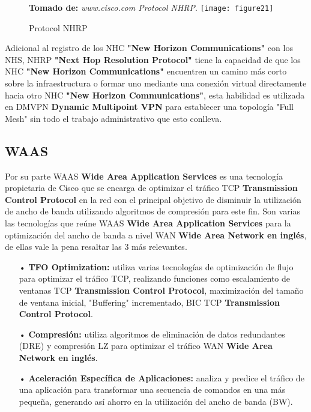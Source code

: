\begin{itemize}
\begin{figure}[htbp]
 \textbf{Tomado de:} \textit{www.cisco.com Protocol NHRP}.
  \centering
    {\texttt{[image: figure21]}}%
  \caption{Protocol NHRP}
  \label{fig:fig2subfig}
\end{figure}
Adicional al registro de los NHC \textbf{"New Horizon Communications"} con los NHS, NHRP \textbf{"Next Hop Resolution Protocol"} tiene la capacidad de que los NHC \textbf{"New Horizon Communications"} encuentren un camino más corto sobre la infraestructura o formar uno mediante una conexión virtual directamente hacia otro NHC \textbf{"New Horizon Communications"}, esta habilidad es utilizada en DMVPN \textbf{ Dynamic Multipoint VPN} para establecer una topología "Full Mesh" sin todo el trabajo administrativo que esto conlleva.
\end{itemize}

\subsection{WAAS}

Por su parte WAAS \textbf{Wide Area Application Services} es una tecnología propietaria de Cisco que se encarga de optimizar el tráfico TCP \textbf{Transmission Control Protocol} en la red con el principal objetivo de disminuir la utilización de ancho de banda utilizando algoritmos de compresión para este fin. Son varias las tecnologías que reúne WAAS \textbf{Wide Area Application Services} para la optimización del ancho de banda a nivel WAN \textbf{Wide Area Network en inglés}, de ellas vale la pena resaltar las 3 más relevantes.

\begin{itemize}
\item[•]\textbf{TFO Optimization:} utiliza varias tecnologías de optimización de flujo para optimizar el tráfico TCP, realizando funciones como escalamiento de ventanas TCP \textbf{Transmission Control Protocol}, maximización del tamaño de ventana inicial, "Buffering" incrementado, BIC TCP \textbf{Transmission Control Protocol}.
\item[•]\textbf{Compresión:} utiliza algoritmos de eliminación de datos redundantes (DRE) y compresión LZ para optimizar el tráfico WAN \textbf{Wide Area Network en inglés}.
\item[•]\textbf{Aceleración Específica de Aplicaciones:} analiza y predice el tráfico de una aplicación para transformar una secuencia de comandos en una más pequeña, generando así ahorro en la utilización del ancho de banda (BW).
\end{itemize}


